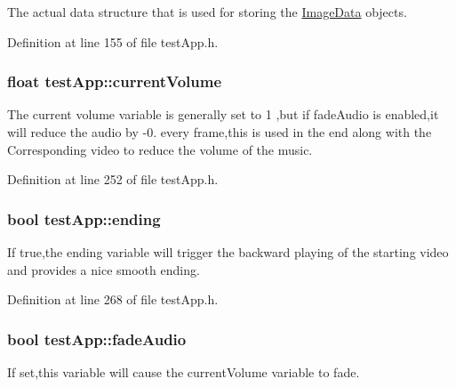 The actual data structure that is used for storing the \hyperlink{struct_image_data}{Image\-Data} objects. 



Definition at line 155 of file test\-App.\-h.

\hypertarget{classtest_app_a51c20c5432d9f6b06f719526d9a34ee6}{
\subsubsection[{current\-Volume}]{\setlength{\rightskip}{0pt plus 5cm}float test\-App\-::current\-Volume}}\label{classtest_app_a51c20c5432d9f6b06f719526d9a34ee6}


The current volume variable is generally set to 1 ,but if fade\-Audio is enabled,it will reduce the audio by -\/0. every frame,this is used in the end along with the Corresponding video to reduce the volume of the music. 



Definition at line 252 of file test\-App.\-h.

\hypertarget{classtest_app_acf09303bc452d2a38098f6bf94655408}{
\subsubsection[{ending}]{\setlength{\rightskip}{0pt plus 5cm}bool test\-App\-::ending}}\label{classtest_app_acf09303bc452d2a38098f6bf94655408}


If true,the ending variable will trigger the backward playing of the starting video and provides a nice smooth ending. 



Definition at line 268 of file test\-App.\-h.

\hypertarget{classtest_app_a918c09b5a4389a8402cfacb25d390226}{
\subsubsection[{fade\-Audio}]{\setlength{\rightskip}{0pt plus 5cm}bool test\-App\-::fade\-Audio}}\label{classtest_app_a918c09b5a4389a8402cfacb25d390226}


If set,this variable will cause the current\-Volume variable to fade. 



